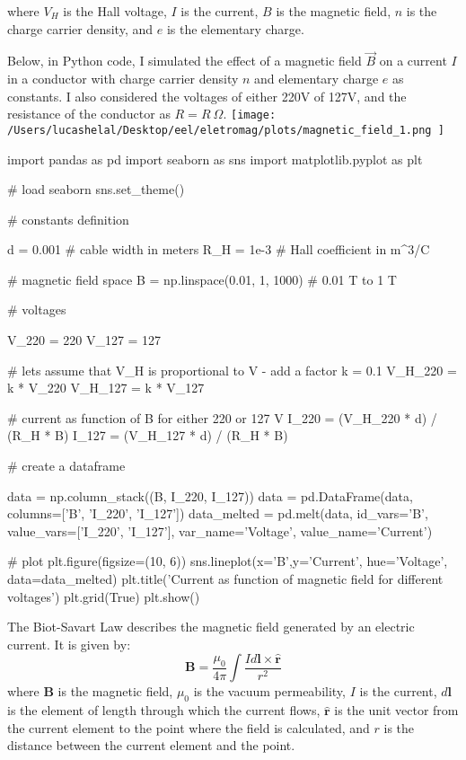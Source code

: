 \documentclass[10pt]{article}
\begin{document}
	where $V_{H}$ is the Hall voltage, $I$ is the current, $B$ is the magnetic field,
	$n$ is the charge carrier density, and $e$ is the elementary charge.

	Below, in Python code, I simulated the effect of a magnetic field $\vec{B}$ on
	a current $I$ in a conductor with charge carrier density $n$ and elementary charge
	$e$ as constants. I also considered the voltages of either 220V of 127V, and the
	resistance of the conductor as $R = R \ \Omega$.
{
  \centering
	\texttt{[image: 
		/Users/lucashelal/Desktop/eel/eletromag/plots/magnetic\_field\_1.png
	]}
}
{
\begin{verbatim*}
  import pandas as pd
  import seaborn as sns
  import matplotlib.pyplot as plt

  # load seaborn
  sns.set_theme()

  # constants definition

  d = 0.001 # cable width in meters
  R_H = 1e-3 # Hall coefficient in m^3/C

  # magnetic field space 
  B = np.linspace(0.01, 1, 1000) # 0.01 T to 1 T

  # voltages

  V_220 = 220
  V_127 = 127

  # lets assume that V_H is proportional to V - add a factor
  k = 0.1
  V_H_220 = k * V_220
  V_H_127 = k * V_127

  # current as function of B for either 220 or 127 V
  I_220 = (V_H_220 * d) / (R_H * B)
  I_127 = (V_H_127 * d) / (R_H * B)

  # create a dataframe

  data = np.column_stack((B, I_220, I_127))
  data = pd.DataFrame(data, columns=['B', 'I_220', 'I_127'])
  data_melted = pd.melt(data, id_vars='B', value_vars=['I_220', 'I_127'], var_name='Voltage', value_name='Current')

  # plot
  plt.figure(figsize=(10, 6))
  sns.lineplot(x='B',y='Current', hue='Voltage', data=data_melted)
  plt.title('Current as function of magnetic field for different voltages')
  plt.grid(True)
  plt.show()
\end{verbatim*}



	\newpage

	The Biot-Savart Law describes the magnetic field generated by an electric
	current. It is given by:
	\[
		\mathbf{B}= \frac{\mu_{0}}{4\pi}\int \frac{I d\mathbf{l} \times \hat{\mathbf{r}}}{r^{2}}
	\]
	where $\mathbf{B}$ is the magnetic field, $\mu_{0}$ is the vacuum permeability,
	$I$ is the current, $d\mathbf{l}$ is the element of length through which the current
	flows, $\hat{\mathbf{r}}$ is the unit vector from the current element to the
	point where the field is calculated, and $r$ is the distance between the current
	element and the point.
}
\end{document}
